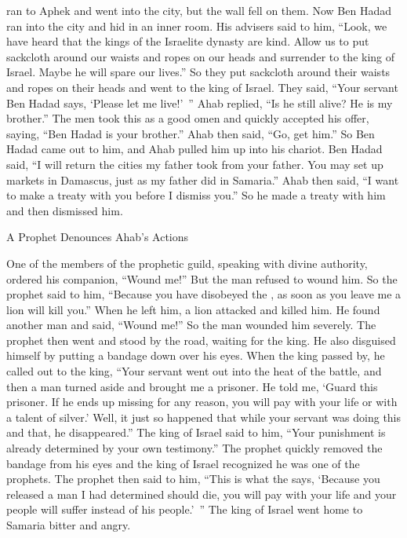 {ran
to Aphek
and went into
the city,
but the wall
fell
on
them.
Now Ben Hadad
ran
into
the city
and hid
in an inner room.
His advisers
said
to
him, “Look,
we
have heard
that
the kings
of the Israelite
dynasty
are kind.
Allow us
to put
sackcloth
around our waists
and ropes
on our heads
and surrender
to
the king
of Israel.
Maybe
he will spare
our lives.”
So
they put sackcloth
around their waists
and ropes
on their heads
and went
to
the king
of Israel.
They said,
“Your servant
Ben Hadad
says,
‘Please
let me
live!’ ” Ahab replied,
“Is he still
alive? He is my brother.”
The men
took this as a good omen
and quickly
accepted
his offer, saying,
“Ben Hadad
is your brother.”
Ahab then said,
“Go,
get
him.” So Ben Hadad
came out
to
him, and Ahab pulled
him up
into
his chariot.
Ben Hadad said,
“I will return
the cities
my father
took
from your father.
You may set up markets
in Damascus,
just
as my father
did in Samaria.”
Ahab then said, “I
want to make a treaty
with you before I dismiss
you.” So
he made
a treaty
with him and then dismissed him.
\par }{\SH A Prophet Denounces Ahab’s Actions
\par }{\PP {}One
of the members of the prophetic guild,
speaking with divine authority, ordered
his companion,
“Wound
me!” But the man
refused
to wound him.
So the prophet said
to him, “Because
you have
disobeyed
the {}, as soon
as you leave
me
a lion
will kill
you.” When
he left
him,
a lion
attacked and killed him.
He found
another
man
and said,
“Wound
me!” So the man
wounded
him severely.
The prophet
then went
and stood
by the road,
waiting for the king.
He also disguised
himself by putting a bandage
down over
his eyes.
When
the king
passed
by, he called out
to
the king,
“Your servant
went out
into the heat
of the battle,
and then
a man
turned aside
and brought
me
a prisoner.
He told
me,
‘Guard
this
prisoner.
If
he ends up missing
for
any reason,
you will
pay
with your life
or
with a talent
of silver.’
Well, it just
so happened
that while your servant
was doing this
and that, he
disappeared.”
The king
of Israel
said
to him,
“Your punishment
is already determined
by your
own testimony.”
The prophet quickly
removed
the bandage
from his eyes
and the king
of Israel
recognized
he
was one of the prophets.
The
prophet then said
to him,
“This is what
the {}
says,
‘Because
you released
a man
I
had determined should die, you will pay
with your
life
and your people
will suffer instead
of his people.’ ”
The king
of Israel
went
home
to Samaria
bitter
and angry.

}
